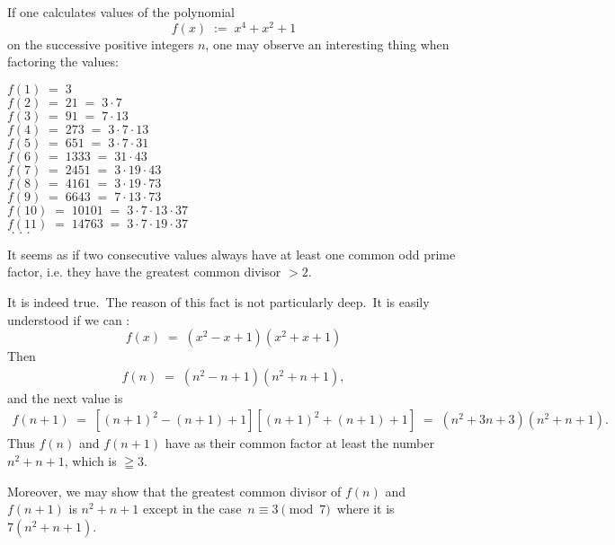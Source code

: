 \documentclass[12pt]{article}
\theoremstyle{definition}
\begin{document}
If one calculates values of the polynomial
     $$f(x) \;:=\; x^4\!+\!x^2\!+\!1$$
on the successive positive integers $n$, one may observe an interesting thing when factoring the values:

$f(1) \;=\; 3$\\
$f(2) \;=\; 21 \;=\; 3\cdot 7$\\
$f(3) \;=\; 91 \;=\; 7\cdot 13$\\
$f(4) \;=\; 273 \;=\; 3\cdot 7\cdot 13$\\
$f(5) \;=\; 651 \;=\; 3\cdot 7\cdot31$\\
$f(6) \;=\; 1333 \;=\; 31\cdot 43$\\
$f(7) \;=\; 2451 \;=\; 3\cdot 19\cdot 43$\\
$f(8) \;=\; 4161 \;=\; 3\cdot 19\cdot 73$\\
$f(9) \;=\; 6643 \;=\; 7\cdot 13\cdot 73$\\
$f(10) \;=\; 10101 \;=\; 3\cdot 7\cdot 13\cdot 37$\\
$f(11) \;=\; 14763 \;=\; 3\cdot 7\cdot 19\cdot 37$\\
$\mbox{ . . . }$

It seems as if two consecutive values always have at least one common odd prime factor, i.e. they have the greatest common divisor $> 2$.

It is indeed true.\, The reason of this fact is not particularly 
deep.\, It is easily understood if we can 
:
    $$f(x) \;=\; (x^2\!-\!x\!+\!1)(x^2\!+\!x\!+\!1)$$
Then
\begin{align}
 f(n) \;=\; (n^2\!-\!n\!+\!1)(n^2\!+\!n\!+\!1),
\end{align}
and the next value is
\begin{align}
f(n\!+\!1) \;=\; [(n\!+\!1)^2\!-\!(n\!+\!1)\!+\!1][(n\!+\!1)^2\!+\!(n\!+\!1)\!+\!1] \;=\; (n^2\!+\!3n\!+\!3)(n^2\!+\!n\!+\!1).
\end{align}
Thus $f(n)$ and $f(n\!+\!1)$ have as their common factor at least the number $n^2\!+\!n\!+\!1$, which is $\geqq 3$.

Moreover, we may show that the greatest common divisor of $f(n)$ and $f(n\!+\!1)$ is $n^2\!+\!n\!+\!1$ except in the case\, $n \equiv 3 \pmod{7}$\, where it is $7(n^2\!+\!n\!+\!1)$.
\end{document}
